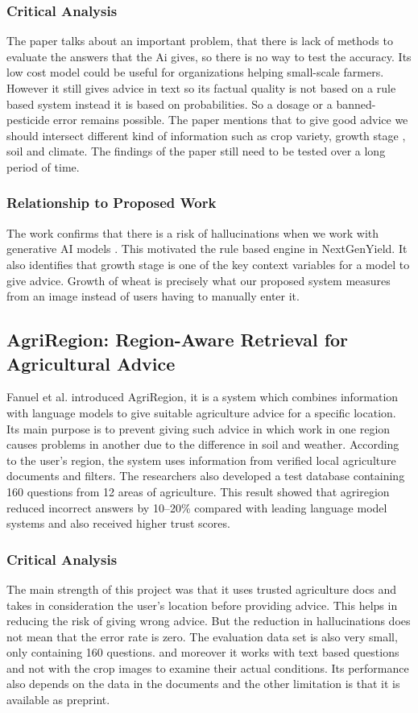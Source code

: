 \documentclass{FastFyp}
\begin{document}
\subsubsection{Critical Analysis}
The paper talks about an important problem, that there is lack of methods to evaluate the answers that the Ai gives, so there is no way to test the accuracy. Its low cost model could be useful for organizations helping small-scale farmers. However it still gives advice in text so its factual quality is not based on a rule based system instead it is based on probabilities. So a dosage or a banned-pesticide error remains possible. The paper mentions that to give good advice we should intersect different kind of information such as crop variety, growth stage , soil and climate. The findings of the paper still need to be tested over a long period of time.

\subsubsection{Relationship to Proposed Work}
The work confirms that there is a risk of hallucinations when we work with generative AI models . This motivated the rule based engine in NextGenYield. It also identifies that growth stage is one of the key context variables for a model to give advice. Growth of wheat is precisely what our proposed system measures from an image instead of users having to manually enter it.

\subsection{AgriRegion: Region-Aware Retrieval for Agricultural Advice}

Fanuel et al. \cite{ref:Fanuel:2025} introduced AgriRegion, it is a system which combines information with language models to give suitable agriculture advice for a specific location. Its main purpose is to prevent giving such advice in which work in one region causes problems in another due to the difference in soil and weather. According to the user's region, the system uses information from verified local agriculture documents and filters. The researchers also developed a test database containing 160 questions from 12 areas of agriculture. This result showed that agriregion reduced incorrect answers by 10--20\% compared with leading language model systems and also received higher trust scores.

\subsubsection{Critical Analysis}
The main strength of this project was that it uses trusted agriculture docs and takes in consideration the user's location before providing advice. This helps in reducing the risk of giving wrong advice. But the reduction in hallucinations does not mean that the error rate is zero. The evaluation data set is also very small, only containing 160 questions. and moreover it works with text based questions and not with the crop images to examine their actual conditions. Its performance also depends on the data in the documents and the other limitation is that it is available as preprint.
\end{document}
